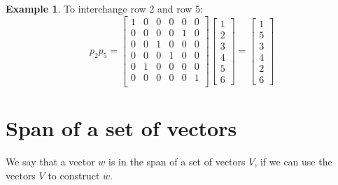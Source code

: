 \documentclass[table]{article}
\theoremstyle{definition}
\newtheorem{ex}{Example}[section]
\begin{document}
  \begin{ex}
    To interchange row 2 and row 5:
    \begin{equation}
      p_2 p_5 =   \begin{bmatrix}
        1 & 0 & 0 & 0 & 0 & 0 \\
        0 & 0 & 0 & 0 & 1 & 0 \\
        0 & 0 & 1 & 0 & 0 & 0 \\
        0 & 0 & 0 & 1 & 0 & 0 \\
        0 & 1 & 0 & 0 & 0 & 0 \\
        0 & 0 & 0 & 0 & 0 & 1 \\
        \end{bmatrix}
          \begin{bmatrix}
            1 \\ 2 \\ 3 \\ 4 \\ 5 \\ 6
          \end{bmatrix}
        =   \begin{bmatrix}
            1 \\ 5 \\ 3 \\ 4 \\ 2 \\ 6
          \end{bmatrix}
    \end{equation}
  \end{ex}
  
  
  \section{Span of a set of vectors}
  We say that a vector $w$ is in the span of a set of vectors $V$, if we can use the vectors $V$ to construct $w$.
  
\end{document}

